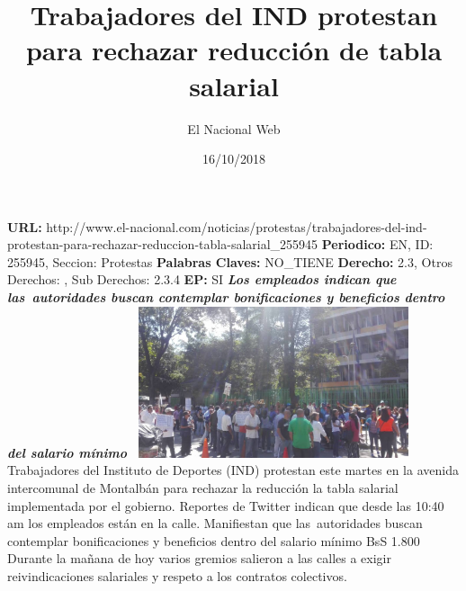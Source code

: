 \documentclass{article}%
\title{\textbf{Trabajadores del IND protestan para rechazar reducción de tabla salarial}}%
\author{El Nacional Web}%
\date{16/10/2018}%
\begin{document}
%
\normalsize%
\maketitle%
\textbf{URL: }%
http://www.el{-}nacional.com/noticias/protestas/trabajadores{-}del{-}ind{-}protestan{-}para{-}rechazar{-}reduccion{-}tabla{-}salarial\_255945\newline%
%
\textbf{Periodico: }%
EN, %
ID: %
255945, %
Seccion: %
Protestas\newline%
%
\textbf{Palabras Claves: }%
NO\_TIENE\newline%
%
\textbf{Derecho: }%
2.3, %
Otros Derechos: %
, %
Sub Derechos: %
2.3.4\newline%
%
\textbf{EP: }%
SI\newline%
\newline%
%
\textbf{\textit{Los empleados indican que las~autoridades buscan contemplar bonificaciones y beneficios dentro del salario mínimo~}}%
\newline%
\newline%
%
\includegraphics[width=300px]{60.jpg}%
\newline%
%
Trabajadores del Instituto de Deportes (IND) protestan este martes en la avenida intercomunal de Montalbán para rechazar la reducción la tabla salarial implementada por el gobierno.%
\newline%
%
Reportes de Twitter indican que desde las 10:40 am los empleados están en la calle. Manifiestan que las~autoridades buscan contemplar bonificaciones y beneficios dentro del salario mínimo BsS 1.800%
\newline%
%
Durante la mañana de hoy varios gremios salieron a las calles a exigir reivindicaciones salariales y respeto a los contratos colectivos.%
\newline%
%
\end{document}
